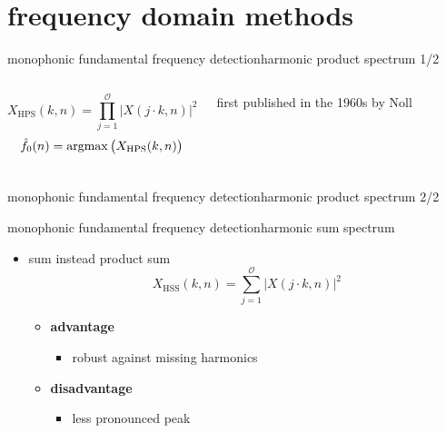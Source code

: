     \section[frequency domain]{frequency domain methods}
	\begin{frame}{monophonic fundamental frequency detection}{harmonic product spectrum 1/2}
        \vspace{-13mm}
        \begin{columns}
                \vspace{4mm}
                \begin{equation*}\label{eq:hps}
                    X_{\mathrm{HPS}}(k,n) = \prod\limits_{j=1}^{\mathcal{O}}{|X(j\cdot k,n)|^2}
                \end{equation*}
                \begin{equation*}\label{eq:f0_hps}
                    \hat{f}_0(n) = \operatorname*{argmax}\big(X_{\mathrm{HPS}}(k,n)\big)
                \end{equation*}
                
                first published in the 1960s by Noll
		\end{columns}
        \vspace{-5mm}
	\end{frame}
	
	\begin{frame}{monophonic fundamental frequency detection}{harmonic product spectrum 2/2}
	\end{frame}
	
	\begin{frame}{monophonic fundamental frequency detection}{harmonic sum spectrum}
        \begin{itemize}
            \item   sum instead product sum
        \begin{equation*}\label{eq:hss}
            X_{\mathrm{HSS}}(k,n) = \sum\limits_{j=1}^{\mathcal{O}}{|X(j\cdot k,n)|^2} 
        \end{equation*}
        \bigskip

                \begin{itemize}
                    \item<1->   \textbf{advantage}
                        \begin{itemize}
                            \item   robust against missing harmonics
                        \end{itemize}
                    \item<1->   \textbf{disadvantage}
                        \begin{itemize}
                            \item   less pronounced peak
                        \end{itemize}
                \end{itemize}
        \end{itemize}
	\end{frame}
	
